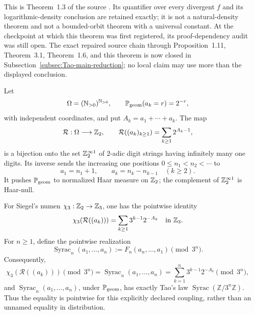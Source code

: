 This is Theorem~1.3 of the source
\cite[Sec.~1.1, Thm.~1.3]{Tao2026v7}.  Its quantifier over every divergent
$f$ and its logarithmic-density conclusion are retained exactly; it is not a
natural-density theorem and not a bounded-orbit theorem with a universal
constant.  At the checkpoint at which this theorem was first registered, its
proof-dependency audit was still open.  The exact repaired source chain
through Proposition~1.11, Theorem~3.1, Theorem~1.6, and this theorem is now
closed in Subsection~\ref{subsec:Tao-main-reduction}; no local claim may use
more than the displayed conclusion.

\begin{proposition}
\label{prop:Siegel-Tao-Syracuse-coordinate}
Let
\[
 \Omega=(\mathbb{N}_{>0})^{\mathbb{N}_{>0}},\qquad
 \mathbb P_{\rm geom}(a_k=r)=2^{-r},
\]
with independent coordinates, and put
\(A_k=a_1+\cdots+a_k\).  The map
\begin{equation}
\label{eq:Siegel-Tao-run-coordinate}
 \mathcal R:\Omega\longrightarrow\mathbb{Z}_{2},
 \qquad
 \mathcal R((a_k)_{k\geq1})=
       \sum_{k\geq1}2^{A_k-1},
\end{equation}
is a bijection onto the set \(\mathbb{Z}_{2}^{\infty1}\) of $2$-adic digit strings
having infinitely many one digits.  Its inverse sends the increasing one
positions \(0\leq n_1<n_2<\cdots\) to
\begin{equation}
\label{eq:Siegel-Tao-run-inverse}
 a_1=n_1+1,\qquad a_k=n_k-n_{k-1}\quad(k\geq2).
\end{equation}
It pushes \(\mathbb P_{\rm geom}\) to normalized Haar measure on \(\mathbb{Z}_{2}\);
the complement of \(\mathbb{Z}_{2}^{\infty1}\) is Haar-null.

For Siegel's numen \(\chi_3:\mathbb{Z}_{2}\to\mathbb Z_3\), one has the pointwise
identity
\begin{equation}
\label{eq:Siegel-Tao-pointwise-Syracuse}
 \chi_3(\mathcal R((a_k)))
   =\sum_{k\geq1}3^{k-1}2^{-A_k}
   \quad\hbox{in }\mathbb Z_3.
\end{equation}
For \(n\geq1\), define the pointwise realization
\[
 \operatorname{Syrac}_n(a_1,\ldots,a_n)
 :=F_n(a_n,\ldots,a_1)\pmod{3^n}.
\]
Consequently,
\begin{equation}
\label{eq:Siegel-Tao-finite-Syracuse}
 \chi_3(\mathcal R((a_k)))\pmod{3^n}
 =\operatorname{Syrac}_n(a_1,\ldots,a_n)
 =\sum_{k=1}^{n}3^{k-1}2^{-A_k}\pmod{3^n},
\end{equation}
and \(\operatorname{Syrac}_n(a_1,\ldots,a_n)\), under
\(\mathbb P_{\rm geom}\), has exactly Tao's law
\(\operatorname{Syrac}(\mathbb Z/3^n\mathbb Z)\).  Thus the equality is
pointwise for this explicitly declared coupling, rather than an unnamed
equality in distribution.
\end{proposition}

